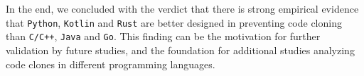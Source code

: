 In the end, we concluded with the verdict that there is strong empirical evidence that \texttt{Python}, \texttt{Kotlin} and \texttt{Rust} are better designed in preventing code cloning than \texttt{C/C++}, \texttt{Java} and \texttt{Go}. This finding can be the motivation for further validation by future studies, and the foundation for additional studies analyzing code clones in different programming languages. 
